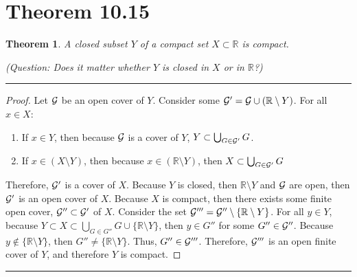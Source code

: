 \documentclass[openany, amssymb, psamsfonts]{amsart}
\newcommand{\bbR}{\mathbb{R}}
\newcommand{\sm}{\setminus}
\newtheorem{thm}{Theorem}[section]
\theoremstyle{definition}
\numberwithin{equation}{section}
\begin{document}
\section*{Theorem 10.15}
\begin{thm}
\label{10.15}
A closed subset $Y$ of a compact set $X \subset \bbR$ is compact.

{\em (Question: Does it matter whether $Y$ is closed in $X$ or in $\bbR$?)}
\end{thm}
\vspace{4pt}     \hrule   \vspace{4pt} \begin{proof}
Let $\mathcal G$ be an open cover of $Y$. Consider some $\cG' = \cG \cup (\bbR \sm Y)$. For all $x\in X$:
\begin{enumerate}
\item If $x\in Y$, then because $\mathcal G$ is a cover of $Y$, $Y\subset \bigcup_{G\in \mathcal G'}G$.
\item If $x\in (X\sm Y)$, then because $x\in (\bbR \sm Y)$, then $X\subset \bigcup_{G\in \mathcal G'}G$
\end{enumerate}
Therefore, $\mathcal G'$ is a cover of $X$. Because $Y$ is closed, then $\bbR\sm Y$ and $\mathcal G$ are open, then $\mathcal G'$ is an open cover of $X$. Because $X$ is compact, then there exists some finite open cover, $\mathcal G''\subset \mathcal G'$ of $X$. Consider the set $\cG''' = \cG'' \sm \{\bbR \sm Y\}$. For all $y\in Y$, because $Y\subset X \subset \bigcup_{G\in G''}G \cup \{\bbR\sm Y\}$, then $y\in G''$ for some $G'' \in \mathcal G''$. Because $y\notin \{\bbR \sm Y\}$, then $G'' \neq \{\bbR \sm Y\}$. Thus, $G'' \in \mathcal G'''$. Therefore, $\mathcal G'''$ is an open finite cover of $Y$, and therefore $Y$ is compact.
\end{proof}\vspace{4pt}     \hrule   \vspace{4pt}
\end{document}
